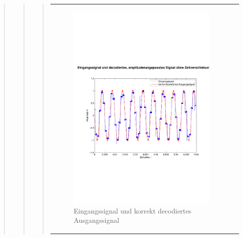 \begin{quote}
\begin{quote}
\begin{quote}
\begin{center}
\begin{tabular}{ll}
                    \begin{minipage}{0.6\textwidth}
                        \begin{figure}[H]
                            \includegraphics[scale=0.4,trim = 0cm 7cm 0cm
                            7.5cm, clip]
                            {./Bilder/sin8_Eingang_vs_korrektDecodiert}
                              \caption{Eingangssignal und
                              korrekt decodiertes Ausgangssignal}
                              \label{sin8_dec_II}
                        \end{figure}
                    \end{minipage}
                
                \end{tabular}
            \end{center}
            

\end{quote}
\end{quote}
\end{quote}
